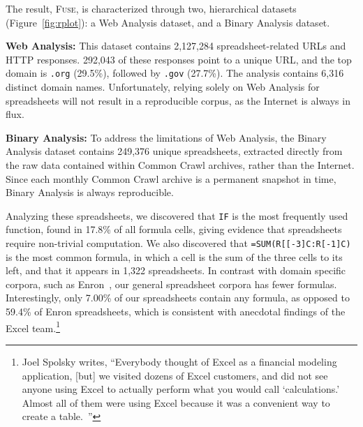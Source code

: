 \documentclass[conference]{IEEEtran}
\newcommand{\urlcount}{2,127,284}
\newcommand{\xlscount}{249,376}
\begin{document}
The result, \textsc{Fuse}, is characterized through two, hierarchical datasets (Figure~\ref{fig:rplot}): a Web Analysis dataset, and a Binary Analysis dataset.

\textbf{Web Analysis:} This dataset contains \urlcount{} spreadsheet-related URLs and HTTP responses. 292,043 of these responses point to a unique URL, and the top domain is \texttt{.org} (29.5\%), followed by \texttt{.gov} (27.7\%). The analysis contains 6,316 distinct domain names. Unfortunately, relying solely on Web Analysis for spreadsheets will not result in a reproducible corpus, as the Internet is always in flux.



\textbf{Binary Analysis:}  To address the limitations of Web Analysis, the Binary Analysis dataset contains \xlscount{} unique spreadsheets, extracted directly from the raw data contained within Common Crawl archives, rather than the Internet. Since each monthly Common Crawl archive is a permanent snapshot in time, Binary Analysis is always reproducible.

Analyzing these spreadsheets, we discovered that \texttt{IF} is the most frequently used function, found in 17.8\% of all formula cells, giving evidence that spreadsheets require non-trivial computation. We also discovered that \texttt{=SUM(R[[-3]C:R[-1]C)} is the most common formula, in which a cell is the sum of the three cells to its left, and that it appears in 1,322 spreadsheets. In contrast with domain specific corpora, such as Enron~\cite{Hermans2015}, our general spreadsheet corpora has fewer formulas. Interestingly, only 7.00\% of our spreadsheets contain any formula, as opposed to 59.4\% of Enron spreadsheets, which is consistent with anecdotal findings of the Excel team.\footnote{Joel Spolsky writes, ``Everybody thought of Excel as a financial modeling application, [but] we visited dozens of Excel customers, and did not see anyone using Excel to actually perform what you would call `calculations.' Almost all of them were using Excel because it was a convenient way to create a table.~\cite{JoelOnSoftware}''}
\end{document}
